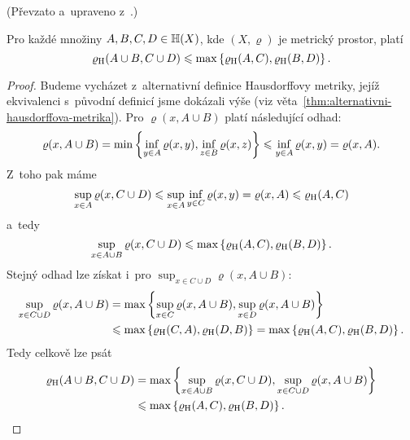 (Převzato a~upraveno z~\citep[str. 79]{Barnsley1993}.)
\begin{lemma}\label{lem:hausdorffova-metrika-odhad-sjednoceni}
    Pro každé množiny $A,B,C,D\in\mathbb{H}(X)$, kde $(X,\varrho)$ je metrický prostor, platí
    \[\varrho_\textup{H}(A\cup B,C\cup D)\leqslant\max\left\{\varrho_\textup{H}(A,C),\varrho_\textup{H}(B,D)\right\}.\]
\end{lemma}
\begin{proof}
    Budeme vycházet z~alternativní definice Hausdorffovy metriky, jejíž ekvivalenci s~původní definicí jsme dokázali výše (viz věta~\ref{thm:alternativni-hausdorffova-metrika}). Pro $\varrho(x,A\cup B)$ platí následující odhad:
    \[\varrho(x,A\cup B)=\min\left\{\inf_{y\in A}\varrho(x,y),\inf_{z\in B}\varrho(x,z)\right\}\leqslant\inf_{y\in A}\varrho(x,y)=\varrho(x,A).\]
    Z~toho pak máme
    \[\sup_{x\in A}\varrho(x,C\cup D)\leqslant\sup_{x\in A}\inf_{y\in C}\varrho(x,y)=\varrho(x,A)\leqslant\varrho_\textup{H}(A,C)\]
    a~tedy
    \[\sup_{x\in A\cup B}\varrho(x,C\cup D)\leqslant\max\left\{\varrho_\textup{H}(A,C),\varrho_\textup{H}(B,D)\right\}.\]
    Stejný odhad lze získat i~pro $\sup_{x\in C\cup D}\varrho(x,A\cup B)$:
    \begin{align*}
        \sup_{x\in C\cup D}\varrho(x,A\cup B)&=\max\left\{\sup_{x\in C}\varrho(x,A\cup B),\sup_{x\in D}\varrho(x,A\cup B)\right\}\\
        &\leqslant\max\left\{\varrho_\textup{H}(C,A),\varrho_\textup{H}(D,B)\right\}=\max\left\{\varrho_\textup{H}(A,C),\varrho_\textup{H}(B,D)\right\}.
    \end{align*}
    Tedy celkově lze psát
    \begin{align*}
        \varrho_\textup{H}(A\cup B,C\cup D)&=\max\left\{\sup_{x\in A\cup B}\varrho(x,C\cup D),\sup_{x\in C\cup D}\varrho(x,A\cup B)\right\}\\
        &\leqslant\max\left\{\varrho_\textup{H}(A,C),\varrho_\textup{H}(B,D)\right\}.
    \end{align*}
\end{proof}


